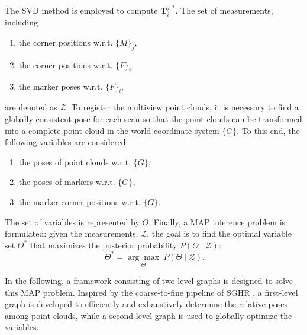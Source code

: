The SVD method \cite{barfoot} is employed to compute $\mathbf{T}^{j,*}_{i}$. The set of measurements, including 
\begin{enumerate}[label=(\roman*)]
	 \item the corner positions w.r.t. $\{M\}_{j}$,
	\item the corner positions w.r.t. $\{F\}_{i}$,
	\item the marker poses w.r.t. $\{F\}_{i}$,
 
\end{enumerate}
are denoted as $\mathcal{Z}$. 
%
To register the multiview point clouds, it is necessary to find a globally consistent pose for each scan so that the point clouds can be transformed into a complete point cloud in the world coordinate system $\{G\}$. 
%
To this end, the following variables are considered: 
\begin{enumerate}[label=(\roman*)]
	 \item the poses of point clouds w.r.t. $\{G\}$,
	\item the poses of markers w.r.t. $\{G\}$,
	\item the marker corner positions w.r.t. $\{G\}$.
\end{enumerate}
\par
The set of variables is represented by $\Theta$. Finally, a MAP inference problem is formulated: given the measurements, $\mathcal{Z}$, the goal is to find the optimal variable set $\Theta^{*}$ that maximizes the posterior probability $P(\Theta \mid \mathcal{Z})$:
\begin{equation}
\
	\Theta^*=\underset{\Theta}{\arg \max } \ P(\Theta \mid \mathcal{Z}).\label{map}
\end{equation} 
\par
In the following, a framework consisting of two-level graphs is designed to solve this MAP problem. Inspired by the coarse-to-fine pipeline of SGHR \cite{sghr}, a first-level graph is developed to efficiently and exhaustively determine the relative poses among point clouds, while a second-level graph is used to globally optimize the variables.


